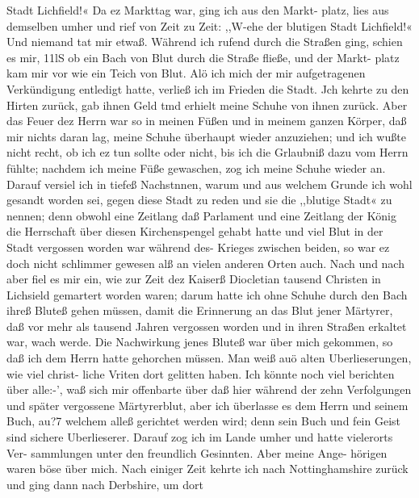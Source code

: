 Stadt Lichfield!« Da ez Markttag war, ging ich aus den Markt-
platz, lies aus demselben umher und rief von Zeit zu Zeit: ,,W-ehe
der blutigen Stadt Lichfield!« Und niemand tat mir etwaß.
Während ich rufend durch die Straßen ging, schien es mir, 11lS
ob ein Bach von Blut durch die Straße fließe, und der Markt-
platz kam mir vor wie ein Teich von Blut. Alö ich mich der
mir aufgetragenen Verkündigung entledigt hatte, verließ ich im
Frieden die Stadt. Jch kehrte zu den Hirten zurück, gab ihnen
Geld tmd erhielt meine Schuhe von ihnen zurück. Aber das
Feuer dez Herrn war so in meinen Füßen und in meinem ganzen
Körper, daß mir nichts daran lag, meine Schuhe überhaupt wieder
anzuziehen; und ich wußte nicht recht, ob ich ez tun sollte oder
nicht, bis ich die Grlaubniß dazu vom Herrn fühlte; nachdem ich
meine Füße gewaschen, zog ich meine Schuhe wieder an. Darauf
versiel ich in tiefeß Nachstnnen, warum und aus welchem Grunde
ich wohl gesandt worden sei, gegen diese Stadt zu reden und sie
die ,,blutige Stadt« zu nennen; denn obwohl eine Zeitlang daß
Parlament und eine Zeitlang der König die Herrschaft über diesen
Kirchenspengel gehabt hatte und viel Blut in der Stadt vergossen
worden war während des- Krieges zwischen beiden, so war ez
doch nicht schlimmer gewesen alß an vielen anderen Orten auch.
Nach und nach aber fiel es mir ein, wie zur Zeit dez Kaiserß
Diocletian tausend Christen in Lichsield gemartert worden waren;
darum hatte ich ohne Schuhe durch den Bach ihreß Bluteß gehen
müssen, damit die Erinnerung an das Blut jener Märtyrer, daß
vor mehr als tausend Jahren vergossen worden und in ihren
Straßen erkaltet war, wach werde. Die Nachwirkung jenes Bluteß
war über mich gekommen, so daß ich dem Herrn hatte gehorchen
müssen. Man weiß auö alten Uberlieserungen, wie viel christ-
liche Vriten dort gelitten haben. Ich könnte noch viel berichten
über alle:-’, waß sich mir offenbarte über daß hier während der
zehn Verfolgungen und später vergossene Märtyrerblut, aber ich
überlasse es dem Herrn und seinem Buch, au?7 welchem alleß
gerichtet werden wird; denn sein Buch und fein Geist sind sichere
Uberlieserer.
Darauf zog ich im Lande umher und hatte vielerorts Ver-
sammlungen unter den freundlich Gesinnten. Aber meine Ange-
hörigen waren böse über mich. Nach einiger Zeit kehrte ich nach
Nottinghamshire zurück und ging dann nach Derbshire, um dort


